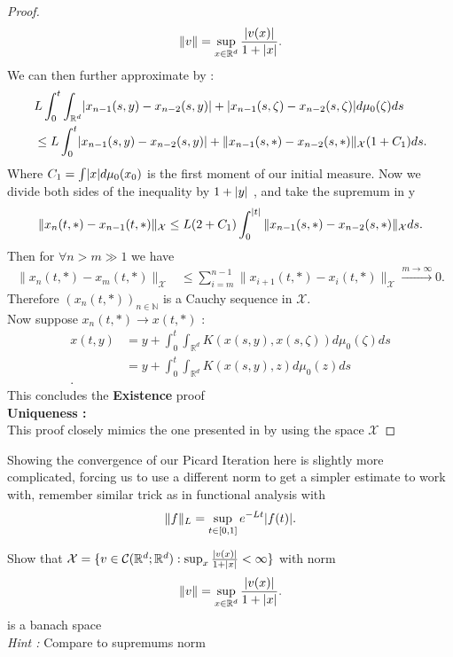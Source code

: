 \begin{proof}
 \begin{align*}
   \|v\| = \sup_{x \in  \mathbb{R}^{d} } \frac{\lvert v(x)\rvert}{1+\lvert x\rvert}
 .\end{align*}
 We can then further approximate  by :
 \begin{align*}
   &L \int_0^{t} \int_{\mathbb{R}^{d} } \lvert x_{n-1}(s,y) - x_{n-2}(s,y)\rvert +  \lvert x_{n-1}(s,\zeta ) - x_{n-2}(s,\zeta )\rvert d\mu_0(\zeta ) ds \\
   &\le L \int_0^{t} \lvert x_{n-1}(s,y) - x_{n-2}(s,y)\rvert +  \|x_{n-1}(s,* ) - x_{n-2}(s,* )\|_{\mathcal{X}} (1+C_1)  ds   
 .\end{align*}
 Where $C_1 = \int \lvert x\rvert d\mu_0(x_0)$ is the first moment of our initial measure.
 Now we divide both sides of the inequality by $1+\lvert y\rvert$ , and take the supremum in y 
 \begin{align*}
   \|x_n(t,*)  - x_{n-1}(t,*)\|_{\mathcal{X}} \le  L (2+C_1) \int_0^{\lvert t\rvert} \|x_{n-1}(s,*)-x_{n-2}(s,*)\|_{\mathcal{X}}  ds
 .\end{align*}
 Then for $\forall  n > m  \gg 1$ we have 
 \begin{align*}
   \|x_{n}(t,*) - x_m(t,*)\|_{\mathcal{X}} &\le  \sum_{i=m}^{n-1} \|x_{i+1}(t,*) - x_i(t,*)\|_{\mathcal{X}} \xrightarrow{m\to \infty} 0
 .\end{align*}
 Therefore $(x_n(t,*))_{n \in  \mathbb{N}}$ is a Cauchy sequence in $\mathcal{X}$.  \\[1ex]
 Now suppose $x_n(t,*) \to x(t,*)$ : 
 \begin{align*}
   x(t,y) &= y+ \int_0^{t} \int_{\mathbb{R}^{d} }  K(x(s,y),x(s,\zeta )) d\mu_0(\zeta ) ds \\
          &= y +  \int_0^{t} \int_{\mathbb{R}^{d} }  K(x(s,y),z) d\mu_0(z) ds \\
 .\end{align*}
 This concludes the \textbf{Existence} proof \\[1ex]
 \textbf{Uniqueness : } \\[1ex]
 This proof closely mimics the one presented in \label{picard1} by using the space $\mathcal{X}$
  \end{proof}
\begin{remark}
Showing the convergence of our Picard Iteration here is slightly more complicated, forcing us to use a different norm to get a simpler
estimate to work with, remember similar trick as in functional analysis with 
\begin{align*}
  \|f\|_L = \sup_{t \in  [0,1]} e^{-Lt}\lvert f(t)\rvert 
.\end{align*}
\end{remark}
\begin{exercise}
 Show that  $\mathcal{X}  = \{v \in  \mathcal{C}(\mathbb{R}^{d };\mathbb{R}^{d}  ) : \sup_x \frac{\lvert v(x)\rvert}{1+\lvert x\rvert} < \infty\}  $ with norm
 \begin{align*}
   \|v\| = \sup_{x \in  \mathbb{R}^{d} } \frac{\lvert v(x)\rvert}{1+\lvert x\rvert}
 .\end{align*}
 is a banach space \\[1ex]
 \textit{Hint :} Compare to supremums norm
\end{exercise}
